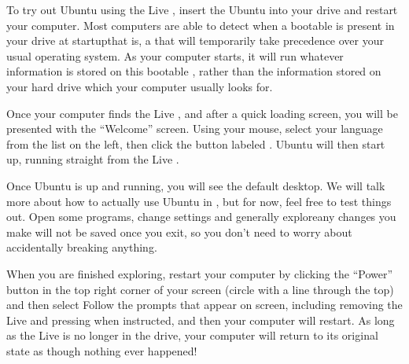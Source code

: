 To try out Ubuntu using the Live , insert the Ubuntu  into your  drive and restart your computer. Most computers are able to detect when a bootable  is present in your drive at startup\dash that is, a  that will temporarily take precedence over your usual operating system. As your computer starts, it will run whatever information is stored on this bootable , rather than the information stored on your hard drive which your computer usually looks for.

Once your computer finds the Live , and after a quick loading screen, you will be presented with the ``Welcome'' screen. Using your mouse, select your language from the list on the left, then click the button labeled . Ubuntu will then start up, running straight from the Live .


Once Ubuntu is up and running, you will see the default desktop. We will talk more about how to actually use Ubuntu in , but for now, feel free to test things out. Open some programs, change settings and generally explore\dash any changes you make will not be saved once you exit, so you don't need to worry about accidentally breaking anything. 

When you are finished exploring, restart your computer by clicking the ``Power'' button in the top right corner of your screen (circle with a line through the top) and then select  Follow the prompts that appear on screen, including removing the Live  and pressing  when instructed, and then your computer will restart. As long as the Live  is no longer in the drive, your computer will return to its original state as though nothing ever happened!

